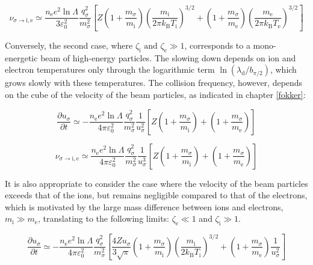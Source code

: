 \begin{equation}
    \nu_{\sigma\to\mathrm{i},\text{e}}\simeq\frac{n_\text{e}e^2\ln{\Lambda}}{3\varepsilon_0^2}\frac{q_\sigma^2}{m_\sigma^2}\left[Z\left(1+\frac{m_\sigma}{m_\mathrm{i}}\right)\left(\frac{m_\mathrm{i}}{2\pi k_\mathrm{B}T_\mathrm{i}}\right)^{3/2}+\left(1+\frac{m_\sigma}{m_\text{e}}\right)\left(\frac{m_\text{e}}{2\pi k_\mathrm{B}T_\text{e}}\right)^{3/2}\right]
\end{equation}

Conversely, the second case, where $\zeta_\mathrm{i}\text{ and }\zeta_\text{e}\gg1$, corresponds to a mono-energetic beam of high-energy particles. The slowing down depends on ion and electron temperatures only through the logarithmic term $\ln{(\lambda_\mathrm{d}/b_{\pi/2})}$, which grows slowly with these temperatures. The collision frequency, however, depends on the cube of the velocity of the beam particles, as indicated in chapter \ref{fokker}:

\begin{equation*}
    \frac{\partial u_\sigma}{\partial t}\simeq-\frac{n_\text{e}e^2\ln{\Lambda}}{4\pi\varepsilon_0^2}\frac{q_\sigma^2}{m_\sigma^2}\frac{1}{u_\sigma^2}\left[Z\left(1+\frac{m_\sigma}{m_\mathrm{i}}\right)+\left(1+\frac{m_\sigma}{m_\text{e}}\right)\right]
\end{equation*}

\begin{equation}
    \nu_{\sigma\to\mathrm{i},\text{e}}\simeq\frac{n_\text{e}e^2\ln{\Lambda}}{4\pi\varepsilon_0^2}\frac{q_\sigma^2}{m_\sigma^2}\frac{1}{u_\sigma^3}\left[Z\left(1+\frac{m_\sigma}{m_\mathrm{i}}\right)+\left(1+\frac{m_\sigma}{m_\text{e}}\right)\right]
\end{equation}

It is also appropriate to consider the case where the velocity of the beam particles exceeds that of the ions, but remains negligible compared to that of the electrons, which is motivated by the large mass difference between ions and electrons, $m_\mathrm{i}\gg m_\text{e}$, translating to the following limits: $\zeta_\text{e}\ll1$ and $\zeta_\mathrm{i}\gg1$.

\begin{equation*}
    \frac{\partial u_\sigma}{\partial t}\simeq-\frac{n_\text{e}e^2\ln{\Lambda}}{4\pi\varepsilon_0^2}\frac{q_\sigma^2}{m_\sigma^2}\left[\frac{4Zu_\sigma}{3\sqrt{\pi}}\left(1+\frac{m_\sigma}{m_\mathrm{i}}\right)\left(\frac{m_\mathrm{i}}{2 k_\mathrm{B}T_\mathrm{i}}\right)^{3/2}+\left(1+\frac{m_\sigma}{m_\text{e}}\right)\frac{1}{u_\sigma^2}\right]
\end{equation*}

